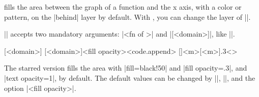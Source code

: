 \icmd{\tzfnarea} fills the area between the graph of a function and the x axis, with a color or pattern, on the |behind| layer by default.
With \icmd{\settzfnarealayer}, you can change the layer of |\tzfnarea|.

|\tzfnarea| accepts two mandatory arguments: |{<fn of \x>}| and |[<domain>]|, like |\tzfn|.

\begin{tzdef}
[<domain>]
[<domain>]{<fill opacity>}<code.append>
  []{<m>}[<m>]{.3}<>
\end{tzdef}

\begin{tzcode}{.3}
{}
\end{tzcode}

\begin{tzcode}{.3}
\end{tzcode}


The starred version \icmd{\tzfnarea*} fills the area with |fill=black!50| and |fill opacity=.3|, and |text opacity=1|, by default.  The default values can be changed by |\settzfillcolor|, |\settzfillopacity|, and the option |{<fill opacity>}|.

\begin{tzcode}{.3}
{}
\end{tzcode}


\begin{tzcode}{.3}
\end{tzcode}



